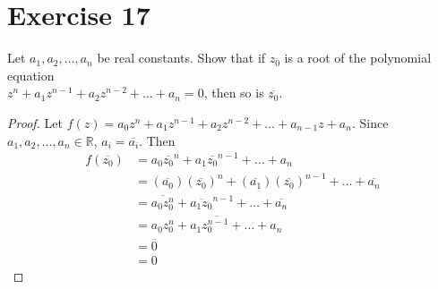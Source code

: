 \documentclass{article}
\begin{document}
\section*{Exercise 17}
Let $a_1, a_2, \ldots, a_n$ be real constants. Show that if $z_0$ is a root of the polynomial equation \\ $z^n + a_1z^{n-1} + a_2z^{n-2} + \ldots + a_n = 0$, then so is $\overline{z_0}$.
\begin{proof}
	Let $f(z) = a_0z^n + a_1z^{n-1} + a_2z^{n-2} + \ldots + a_{n-1}z + a_n$. Since $a_1,a_2,\ldots,a_n \in \mathbb{R}$, $a_i = \overline{a_i}$. Then
\begin{align*}
	f(\overline{z_0}) &= a_0\overline{z_0}^n + a_1\overline{z_0}^{n-1} + \ldots + a_n \\
			&= (\overline{a_0})(\overline{z_0})^n + (\overline{a_1})(\overline{z_0})^{n-1} + \ldots + \overline{a_n} \\
			&= \overline{a_0z_0^n} + \overline{a_1z_0}^{n-1} + \ldots + \overline{a_n} \\
			&= \overline{a_0z_0^n + a_1z_0^{n-1} + \ldots + a_n} \\
			&= \overline{0} \\
			&= 0
\end{align*}
\end{proof}
\end{document}
